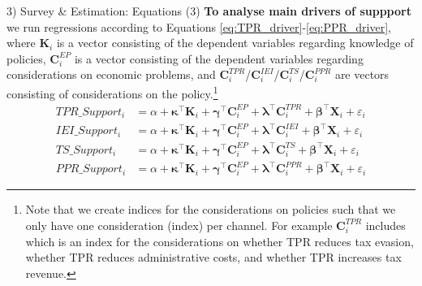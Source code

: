 \documentclass{beamer}
\begin{document}
\begin{frame}{3) Survey \& Estimation: Equations (3)} 
\label{equations3}
\textbf{To analyse main drivers of suppport} we run regressions according to Equations \ref{eq:TPR_driver}-\ref{eq:PPR_driver}, where $\mathbf{K}_i$ is a vector consisting of the dependent variables regarding knowledge of policies, $\mathbf{C}_i^{EP}$ is a vector consisting of the dependent variables regarding considerations on economic problems, and $\mathbf{C}_i^{TPR}$/$\mathbf{C}_i^{IEI}$/$\mathbf{C}_i^{TS}$/$\mathbf{C}_i^{PPR}$ are vectors consisting of considerations on the policy.\footnote[8]{Note that we create indices for the considerations on policies such that we only have one consideration (index) per channel. For example $\mathbf{C}_i^{TPR}$ includes  which is an index for the considerations on whether TPR reduces tax evasion, whether TPR reduces administrative costs, and whether TPR increases tax revenue.}
\begin{align}
    \label{eq:TPR_driver}
    \text{$TPR\_Support_i$} 
    &= \alpha 
    + \boldsymbol{\kappa}^{\top}\mathbf{K}_i
    + \boldsymbol{\gamma}^{\top}\mathbf{C}_i^{EP} 
    + \boldsymbol{\lambda}^{\top}\mathbf{C}_i^{TPR}
    + \boldsymbol{\beta}^{\top}\mathbf{X}_i
    + \varepsilon_i \\
    \text{$IEI\_Support_i$} 
    &= \alpha 
    + \boldsymbol{\kappa}^{\top}\mathbf{K}_i
    + \boldsymbol{\gamma}^{\top}\mathbf{C}_i^{EP} 
    + \boldsymbol{\lambda}^{\top}\mathbf{C}_i^{IEI}
    + \boldsymbol{\beta}^{\top}\mathbf{X}_i
    + \varepsilon_i \\
    \text{$TS\_Support_i$} 
    &= \alpha 
    + \boldsymbol{\kappa}^{\top}\mathbf{K}_i
    + \boldsymbol{\gamma}^{\top}\mathbf{C}_i^{EP} 
    + \boldsymbol{\lambda}^{\top}\mathbf{C}_i^{TS}
    + \boldsymbol{\beta}^{\top}\mathbf{X}_i
    + \varepsilon_i \\
    \label{eq:PPR_driver}
    \text{$PPR\_Support_i$} 
    &= \alpha 
    + \boldsymbol{\kappa}^{\top}\mathbf{K}_i
    + \boldsymbol{\gamma}^{\top}\mathbf{C}_i^{EP} 
    + \boldsymbol{\lambda}^{\top}\mathbf{C}_i^{PPR}
    + \boldsymbol{\beta}^{\top}\mathbf{X}_i
    + \varepsilon_i
\end{align}    
\hfill \hyperlink{Example:PolicySupportDrivers}{} 
\end{frame}
\end{document}
